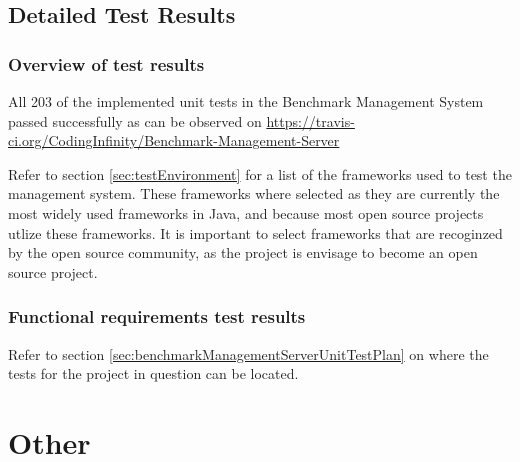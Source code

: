 \documentclass[11pt,a4paper]{article}
\begin{document}
\subsection{Detailed Test Results}\label{Results}
\subsubsection{Overview of test results}
All 203 of the implemented unit tests in the Benchmark Management System passed
successfully as can be observed on \url{https://travis-ci.org/CodingInfinity/Benchmark-Management-Server}

Refer to section \ref{sec:testEnvironment} for a list of the frameworks used
to test the management system. These frameworks where selected as they are currently
the most widely used frameworks in Java, and because most open source projects utlize
these frameworks. It is important to select frameworks that are recoginzed by the
open source community, as the project is envisage to become an open source project.

\subsubsection{Functional requirements test results}
Refer to section \ref{sec:benchmarkManagementServerUnitTestPlan} on where the 
tests for the project in question can be located.

\section{Other}
\end{document}
